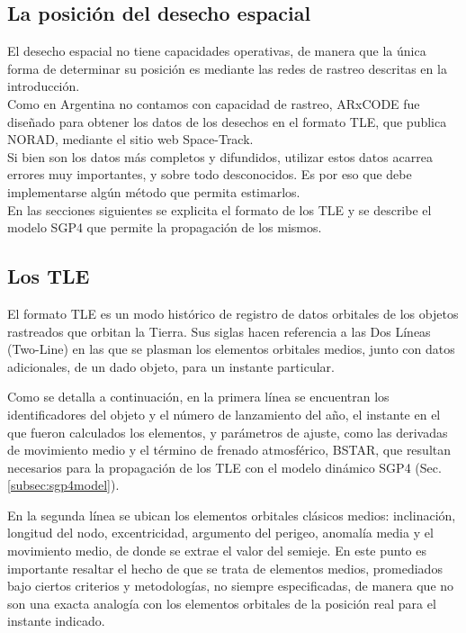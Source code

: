 \subsection*{La posici\'on del desecho espacial}
El desecho espacial no tiene capacidades operativas, de manera que la \'unica forma de determinar su posici\'on es mediante las redes de rastreo descritas en la introducci\'on.\\
Como en Argentina no contamos con capacidad de rastreo, ARxCODE fue dise\~nado para obtener los datos de los desechos en el formato TLE, que publica NORAD, mediante el sitio web Space-Track.\\
Si bien son los datos m\'as completos y difundidos, utilizar estos datos acarrea errores muy importantes, y sobre todo desconocidos. Es por eso que debe implementarse alg\'un m\'etodo que permita estimarlos.\\

En las secciones siguientes se explicita el formato de los TLE y se describe el modelo SGP4 que permite la propagaci\'on de los mismos.\\

\subsection*{Los TLE}{\label{subsec:tleformat}}

El formato TLE es un modo hist\'orico de registro de datos orbitales de los objetos rastreados que orbitan la Tierra. Sus siglas  hacen referencia a las Dos L\'ineas (Two-Line) en las que se plasman los elementos orbitales medios, junto con datos adicionales, de un dado objeto, para un instante particular.

Como se detalla a continuación, en la primera l\'inea se encuentran los identificadores del objeto y el n\'umero de lanzamiento del año, el instante en el que fueron calculados los elementos, y parámetros de ajuste, como las derivadas de movimiento medio y el t\'ermino de frenado atmosf\'erico, BSTAR, que resultan necesarios para la propagación de los TLE con el modelo dinámico SGP4 (Sec. \ref{subsec:sgp4model}).

En la segunda l\'inea se ubican los elementos orbitales cl\'asicos medios: inclinaci\'on, longitud del nodo, excentricidad, argumento del perigeo, anomal\'ia media y el movimiento medio, de donde se extrae el valor del semieje. En este punto es importante resaltar el hecho de que se trata de elementos medios, promediados bajo ciertos criterios y metodologías, no siempre especificadas, de manera que no son una exacta analog\'ia con los elementos orbitales de la posici\'on real para el instante indicado.


